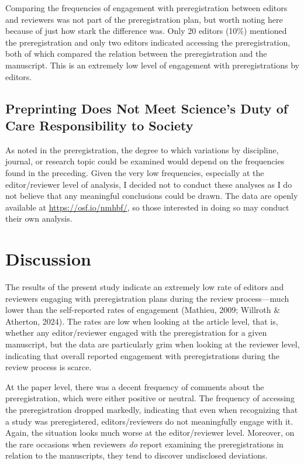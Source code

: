 \documentclass[authordate, meta, issue]{jote-new-article}
\begin{document}
	Comparing the frequencies of engagement with preregistration between editors and reviewers was not part of the preregistration plan, but worth noting here because of just how stark the difference was. Only 20 editors (10\%) mentioned the preregistration and only two editors indicated accessing the preregistration, both of which compared the relation between the preregistration and the manuscript. This is an extremely low level of engagement with preregistrations by editors.



	\subsection{Preprinting Does Not Meet Science’s Duty of Care Responsibility to Society}



	As noted in the preregistration, the degree to which variations by discipline, journal, or research topic could be examined would depend on the frequencies found in the preceding. Given the very low frequencies, especially at the editor/reviewer level of analysis, I decided not to conduct these analyses as I do not believe that any meaningful conclusions could be drawn. The data are openly available at \url{https://osf.io/nmhbf/}, so those interested in doing so may conduct their own analysis.



	\section{Discussion}



	The results of the present study indicate an extremely low rate of editors and reviewers engaging with preregistration plans during the review process—much lower than the self-reported rates of engagement (Mathieu, 2009; Willroth \& Atherton, 2024). The rates are low when looking at the article level, that is, whether any editor/reviewer engaged with the preregistration for a given manuscript, but the data are particularly grim when looking at the reviewer level, indicating that overall reported engagement with preregistrations during the review process is scarce.



	At the paper level, there was a decent frequency of comments about the preregistration, which were either positive or neutral. The frequency of accessing the preregistration dropped markedly, indicating that even when recognizing that a study was preregistered, editors/reviewers do not meaningfully engage with it. Again, the situation looks much worse at the editor/reviewer level. Moreover, on the rare occasions when reviewers \emph{do} report examining the preregistrations in relation to the manuscripts, they tend to discover undisclosed deviations.
\end{document}
